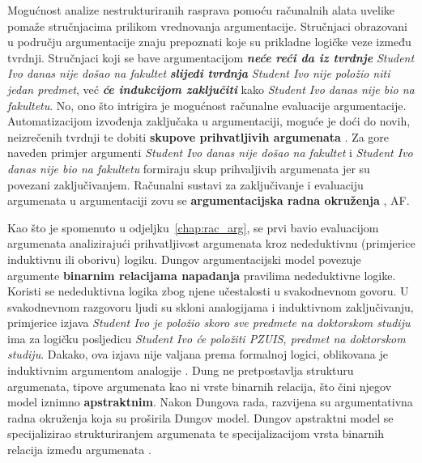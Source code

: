 Mogućnost analize nestrukturiranih rasprava pomoću
računalnih alata uvelike pomaže stručnjacima prilikom 
vrednovanja argumentacije. 
Stručnjaci obrazovani u području argumentacije znaju prepoznati
koje su prikladne logičke veze između tvrdnji.   
Stručnjaci koji se bave argumentacijom \textbf{\emph{neće reći da iz tvrdnje}}
\emph{Student Ivo danas nije došao na fakultet} \textbf{\emph{slijedi tvrdnja}}
\emph{Student Ivo nije položio niti jedan predmet}, već \textbf{\emph{će 
indukcijom zaključiti}} kako
\emph{Student Ivo danas nije bio na fakultetu}. 
No, ono što intrigira je 
mogućnost računalne evaluacije argumentacije. 
Automatizacijom izvođenja zaključaka u argumentaciji,
moguće je doći do novih, neizrečenih tvrdnji te 
dobiti \textbf{skupove prihvatljivih argumenata} . 
Za gore naveden primjer argumenti \emph{Student Ivo danas nije došao na fakultet}
i \emph{Student Ivo danas nije bio na fakultetu} 
formiraju skup prihvaljivih argumenata jer su povezani 
zaključivanjem.  
Računalni sustavi za zaključivanje 
i evaluaciju argumenata u argumentaciji zovu se 
\textbf{argumentacijska radna okruženja} , \@{AF}.

Kao što je spomenuto u odjeljku~\ref{chap:rac_arg},
\cite{dung1995acceptability} se prvi bavio 
evaluacijom argumenata analizirajući prihvatljivost argumenata 
kroz nededuktivnu (primjerice induktivnu ili oborivu) logiku.
Dungov argumentacijski model povezuje argumente \textbf{binarnim relacijama
napadanja} pravilima nededuktivne logike. 
Koristi se nededuktivna logika zbog njene učestalosti u svakodnevnom 
govoru.  
U svakodnevnom razgovoru ljudi su skloni analogijama i induktivnom zaključivanju, 
primjerice izjava \emph{Student Ivo je položio skoro sve predmete na doktorskom studiju} 
ima za logičku posljedicu \emph{Student Ivo će položiti PZUIS, predmet na doktorskom studiju}. 
Dakako, ova izjava nije valjana prema formalnoj logici, oblikovana je
induktivnim argumentom analogije
\citep{juthe2005argument}.
Dung ne pretpostavlja strukturu argumenata, tipove argumenata kao ni
vrste binarnih relacija,  
što čini njegov model iznimno \textbf{apstraktnim}. 
Nakon Dungova rada, razvijena 
su argumentativna radna okruženja koja su proširila Dungov model.
Dungov apstraktni model se specijalizirao 
strukturiranjem argumenata  
te specijalizacijom 
vrsta binarnih relacija između argumenata \citep{vreeswijk1993feasibility}. 

